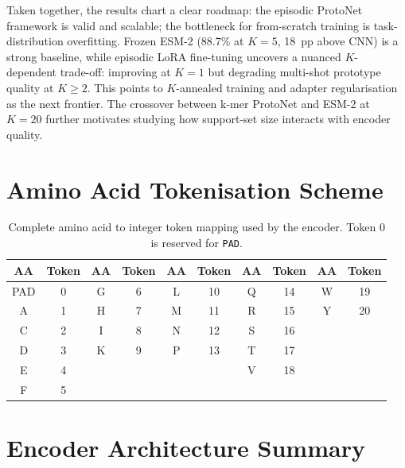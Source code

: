 \documentclass[11pt,a4paper]{article}
\begin{document}
Taken together, the results chart a clear roadmap: the episodic ProtoNet
framework is valid and scalable; the bottleneck for from-scratch training is
task-distribution overfitting.  Frozen ESM-2 (88.7\% at $K=5$, 18~pp above CNN)
is a strong baseline, while episodic LoRA fine-tuning uncovers a nuanced
$K$-dependent trade-off: improving at $K=1$ but degrading multi-shot prototype
quality at $K \geq 2$.  This points to $K$-annealed training and adapter
regularisation as the next frontier.  The crossover between k-mer ProtoNet and
ESM-2 at $K=20$ further motivates studying how support-set size interacts with
encoder quality.

\appendix
\section{Amino Acid Tokenisation Scheme}
\label{app:tokenisation}

\begin{table}[H]
\centering
\caption{Complete amino acid to integer token mapping used by the encoder.
         Token 0 is reserved for \texttt{PAD}.}
\label{tab:tokens}
\small
\begin{tabular}{cc|cc|cc|cc|cc}
\toprule
AA & Token & AA & Token & AA & Token & AA & Token & AA & Token \\
\midrule
PAD & 0 & G & 6 & L & 10 & Q & 14 & W & 19 \\
A & 1 & H & 7 & M & 11 & R & 15 & Y & 20 \\
C & 2 & I & 8 & N & 12 & S & 16 & & \\
D & 3 & K & 9 & P & 13 & T & 17 & & \\
E & 4 & & & & & V & 18 & & \\
F & 5 & & & & & & & & \\
\bottomrule
\end{tabular}
\end{table}

\section{Encoder Architecture Summary}
\label{app:arch}
\end{document}
